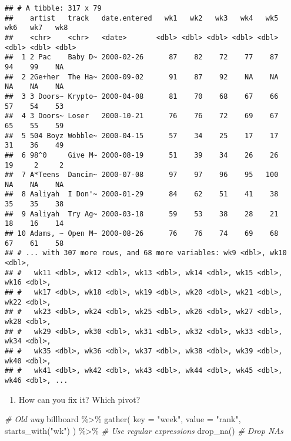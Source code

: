 \documentclass[
]{book}
\newenvironment{Shaded}{\begin{snugshade}}{\end{snugshade}}
\newcommand{\AttributeTok}[1]{\textcolor[rgb]{0.77,0.63,0.00}{#1}}
\newcommand{\CommentTok}[1]{\textcolor[rgb]{0.56,0.35,0.01}{\textit{#1}}}
\newcommand{\FunctionTok}[1]{\textcolor[rgb]{0.00,0.00,0.00}{#1}}
\newcommand{\NormalTok}[1]{#1}
\newcommand{\SpecialCharTok}[1]{\textcolor[rgb]{0.00,0.00,0.00}{#1}}
\newcommand{\StringTok}[1]{\textcolor[rgb]{0.31,0.60,0.02}{#1}}
\providecommand{\tightlist}{%
  \setlength{\itemsep}{0pt}\setlength{\parskip}{0pt}}
\begin{document}
\begin{verbatim}
## # A tibble: 317 x 79
##    artist   track   date.entered   wk1   wk2   wk3   wk4   wk5   wk6   wk7   wk8
##    <chr>    <chr>   <date>       <dbl> <dbl> <dbl> <dbl> <dbl> <dbl> <dbl> <dbl>
##  1 2 Pac    Baby D~ 2000-02-26      87    82    72    77    87    94    99    NA
##  2 2Ge+her  The Ha~ 2000-09-02      91    87    92    NA    NA    NA    NA    NA
##  3 3 Doors~ Krypto~ 2000-04-08      81    70    68    67    66    57    54    53
##  4 3 Doors~ Loser   2000-10-21      76    76    72    69    67    65    55    59
##  5 504 Boyz Wobble~ 2000-04-15      57    34    25    17    17    31    36    49
##  6 98^0     Give M~ 2000-08-19      51    39    34    26    26    19     2     2
##  7 A*Teens  Dancin~ 2000-07-08      97    97    96    95   100    NA    NA    NA
##  8 Aaliyah  I Don'~ 2000-01-29      84    62    51    41    38    35    35    38
##  9 Aaliyah  Try Ag~ 2000-03-18      59    53    38    28    21    18    16    14
## 10 Adams, ~ Open M~ 2000-08-26      76    76    74    69    68    67    61    58
## # ... with 307 more rows, and 68 more variables: wk9 <dbl>, wk10 <dbl>,
## #   wk11 <dbl>, wk12 <dbl>, wk13 <dbl>, wk14 <dbl>, wk15 <dbl>, wk16 <dbl>,
## #   wk17 <dbl>, wk18 <dbl>, wk19 <dbl>, wk20 <dbl>, wk21 <dbl>, wk22 <dbl>,
## #   wk23 <dbl>, wk24 <dbl>, wk25 <dbl>, wk26 <dbl>, wk27 <dbl>, wk28 <dbl>,
## #   wk29 <dbl>, wk30 <dbl>, wk31 <dbl>, wk32 <dbl>, wk33 <dbl>, wk34 <dbl>,
## #   wk35 <dbl>, wk36 <dbl>, wk37 <dbl>, wk38 <dbl>, wk39 <dbl>, wk40 <dbl>,
## #   wk41 <dbl>, wk42 <dbl>, wk43 <dbl>, wk44 <dbl>, wk45 <dbl>, wk46 <dbl>, ...
\end{verbatim}

\begin{enumerate}
\def\labelenumi{\arabic{enumi}.}
\setcounter{enumi}{1}
\tightlist
\item
  How can you fix it? Which pivot?
\end{enumerate}

\begin{Shaded}
\begin{Highlighting}[]
\CommentTok{\# Old way}
\NormalTok{billboard }\SpecialCharTok{\%\textgreater{}\%}
  \FunctionTok{gather}\NormalTok{(}
    \AttributeTok{key =} \StringTok{"week"}\NormalTok{,}
    \AttributeTok{value =} \StringTok{"rank"}\NormalTok{,}
    \FunctionTok{starts\_with}\NormalTok{(}\StringTok{"wk"}\NormalTok{)}
\NormalTok{  ) }\SpecialCharTok{\%\textgreater{}\%} \CommentTok{\# Use regular expressions}
  \FunctionTok{drop\_na}\NormalTok{() }\CommentTok{\# Drop NAs}
\end{Highlighting}
\end{Shaded}
\end{document}
